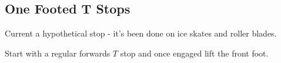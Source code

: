 \subsection*{One Footed T Stops}
\label{drill:t_stop:one_foot}

Current a hypothetical stop - it's been done on ice skates and roller blades.  

Start with a regular forwards $T$ stop and once engaged lift the front foot.

